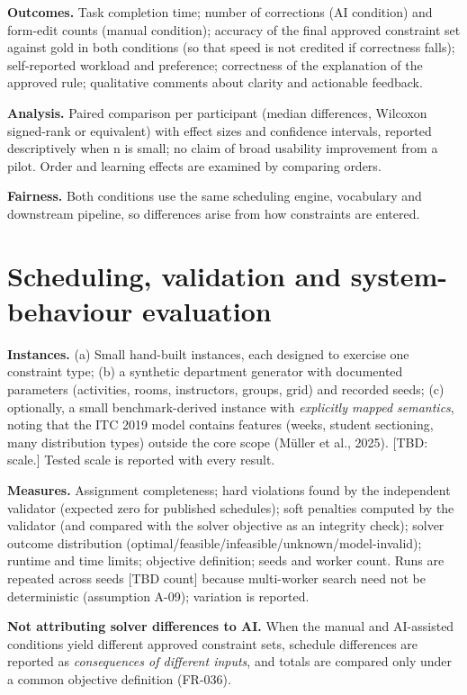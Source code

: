 \documentclass[
  11pt,a4paper,oneside]{report}
\begin{document}
\textbf{Outcomes.} Task completion time; number of corrections (AI
condition) and form-edit counts (manual condition); accuracy of the
final approved constraint set against gold in both conditions (so that
speed is not credited if correctness falls); self-reported workload and
preference; correctness of the explanation of the approved rule; qualitative comments about clarity and actionable feedback.

\textbf{Analysis.} Paired comparison per participant (median
differences, Wilcoxon signed-rank or equivalent) with effect sizes and
confidence intervals, reported descriptively when n is small; no claim
of broad usability improvement from a pilot. Order and learning effects
are examined by comparing orders.

\textbf{Fairness.} Both conditions use the same scheduling engine,
vocabulary and downstream pipeline, so differences arise from how
constraints are entered.

\hypertarget{scheduling-validation-and-system-behaviour-evaluation}{%
\section{Scheduling, validation and system-behaviour
evaluation}\label{scheduling-validation-and-system-behaviour-evaluation}}

\textbf{Instances.} (a) Small hand-built instances, each designed to
exercise one constraint type; (b) a synthetic department generator with
documented parameters (activities, rooms, instructors, groups, grid) and
recorded seeds; (c) optionally, a small benchmark-derived instance with
\emph{explicitly mapped semantics}, noting that the ITC 2019 model
contains features (weeks, student sectioning, many distribution types)
outside the core scope (Müller et al., 2025). {[}TBD: scale.{]} Tested
scale is reported with every result.

\textbf{Measures.} Assignment completeness; hard violations found by the
independent validator (expected zero for published schedules); soft
penalties computed by the validator (and compared with the solver
objective as an integrity check); solver outcome distribution
(optimal/feasible/infeasible/unknown/model-invalid); runtime and time
limits; objective definition; seeds and worker count. Runs are repeated
across seeds {[}TBD count{]} because multi-worker search need not be
deterministic (assumption A-09); variation is reported.

\textbf{Not attributing solver differences to AI.} When the manual and
AI-assisted conditions yield different approved constraint sets,
schedule differences are reported as \emph{consequences of different
inputs}, and totals are compared only under a common objective
definition (FR-036).
\end{document}
